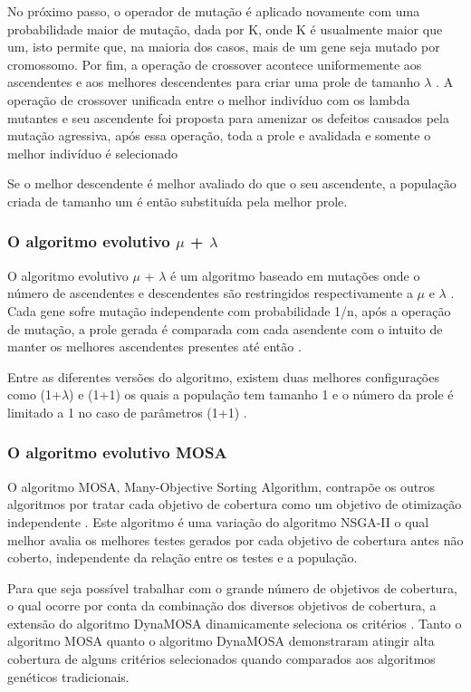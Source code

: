 \documentclass[
	12pt,				%
	oneside,			%
	a4paper,			%
	english,			%
	brazil				%
	]{abntex2ppgsi}
\begin{document}
No próximo passo, o operador de mutação é aplicado novamente com uma probabilidade maior de mutação, dada por K, onde K é usualmente maior que um, isto permite que, na maioria dos casos, mais de um gene seja mutado por cromossomo. Por fim, a operação de crossover acontece uniformemente aos ascendentes e aos melhores descendentes para criar uma prole de  tamanho $\lambda$  \cite{Campos2017}. A operação de crossover unificada entre o melhor indivíduo com os lambda mutantes e seu ascendente foi proposta para amenizar os defeitos causados pela mutação agressiva, após essa operação, toda a prole e avalidada e somente o melhor indivíduo é selecionado \cite{Campos2017}

Se o melhor descendente é melhor avaliado do que o seu ascendente, a população criada de tamanho um é então substituída pela melhor prole. \cite{Campos2017}

\subsubsection{O algoritmo evolutivo  $\mu$ + $\lambda$}

O algoritmo evolutivo $\mu$ + $\lambda$  é um algoritmo baseado em mutações onde o número de ascendentes e descendentes são restringidos respectivamente  a $\mu$ e $\lambda$ \cite{Campos2017}. Cada gene sofre mutação independente com probabilidade 1/n, após a operação de mutação, a prole gerada é comparada com cada asendente com o intuito de manter os melhores ascendentes presentes até então \cite{Campos2017}.

Entre as diferentes versões do algoritmo, existem duas melhores configurações como (1+$\lambda$) e (1+1) os quais a população tem tamanho 1 e o número da prole é limitado a 1 no caso de parâmetros (1+1) \cite{Campos2017}.

\subsubsection{O algoritmo evolutivo MOSA}
O algoritmo MOSA, Many-Objective Sorting Algorithm, contrapõe os outros algoritmos por tratar cada objetivo de cobertura como um objetivo de otimização independente \cite{Campos2017}. Este algoritmo é uma variação do algoritmo NSGA-II o qual melhor avalia os melhores testes gerados por cada objetivo de cobertura antes não coberto, independente da relação entre os testes e a população. \cite{Campos2017}

Para que seja possível trabalhar com o grande número de objetivos de cobertura, o qual ocorre por conta da combinação dos diversos objetivos de cobertura, a extensão  do algoritmo DynaMOSA dinamicamente seleciona  os critérios  \cite{Campos2017}. Tanto o algoritmo MOSA quanto o algoritmo DynaMOSA demonstraram atingir alta cobertura de alguns critérios selecionados quando comparados aos algoritmos genéticos tradicionais. \cite{Campos2017}
\end{document}
